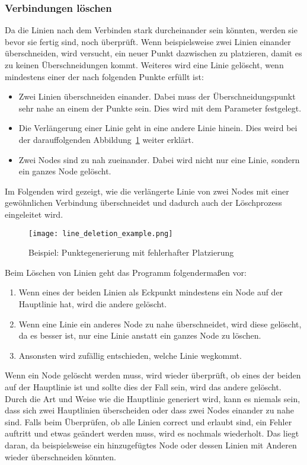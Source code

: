 \subsubsection{Verbindungen löschen}\label{subsubsec:verbindungen-loeschen}
Da die Linien nach dem Verbinden stark durcheinander sein könnten, werden sie bevor sie fertig sind, noch überprüft.
Wenn beispielsweise zwei Linien einander überschneiden, wird versucht, ein neuer Punkt dazwischen zu platzieren, damit es zu keinen Überschneidungen kommt.
Weiteres wird eine Linie gelöscht, wenn mindestens einer der nach folgenden Punkte erfüllt ist:
\begin{itemize}
    \item Zwei Linien überschneiden einander.
    Dabei muss der Überschneidungspunkt sehr nahe an einem der Punkte sein.
    Dies wird mit dem Parameter  festgelegt.
    \item Die Verlängerung einer Linie geht in eine andere Linie hinein.
    Dies weird bei der darauffolgenden Abbildung~\ref{fig:line-deletion} weiter erklärt.
    \item Zwei Nodes sind zu nah zueinander.
    Dabei wird nicht nur eine Linie, sondern ein ganzes Node gelöscht.
\end{itemize}

Im Folgenden wird gezeigt, wie die verlängerte Linie von zwei Nodes mit einer gewöhnlichen Verbindung überschneidet und dadurch auch der Löschprozess eingeleitet wird.
\begin{figure}[H]
    \centering
    \texttt{[image: line\_deletion\_example.png]}
    \caption{Beispiel: Punktegenerierung mit fehlerhafter Platzierung}\label{fig:line-deletion}
\end{figure}

Beim Löschen von Linien geht das Programm folgendermaßen vor:
\begin{enumerate}
    \item Wenn eines der beiden Linien als Eckpunkt mindestens ein Node auf der Hauptlinie hat, wird die andere gelöscht.
    \item Wenn eine Linie ein anderes Node zu nahe überschneidet, wird diese gelöscht, da es besser ist, nur eine Linie anstatt ein ganzes Node zu löschen.
    \item Ansonsten wird zufällig entschieden, welche Linie wegkommt.
\end{enumerate}

Wenn ein Node gelöscht werden muss, wird wieder überprüft, ob eines der beiden auf der Hauptlinie ist und sollte dies der Fall sein, wird das andere gelöscht.
Durch die Art und Weise wie die Hauptlinie generiert wird, kann es niemals sein, dass sich zwei Hauptlinien überscheiden oder dass zwei Nodes einander zu nahe sind.
Falls beim Überprüfen, ob alle Linien correct und erlaubt sind, ein Fehler auftritt und etwas geändert werden muss, wird es nochmals wiederholt.
Das liegt daran, da beispielsweise ein hinzugefügtes Node oder dessen Linien mit Anderen wieder überschneiden könnten.
